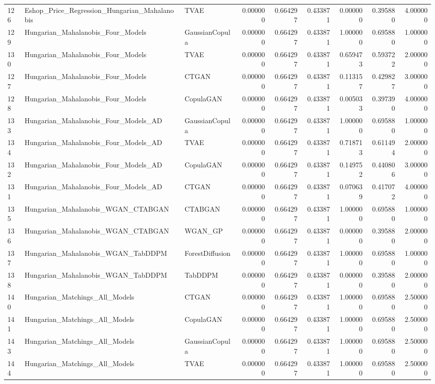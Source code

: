 \begin{tabular}{lllrrrrrr}
126 & Eshop_Price_Regression_Hungarian_Mahalanobis & TVAE & 0.000000 & 0.664297 & 0.433871 & 0.000000 & 0.395880 & 4.000000 \\
129 & Hungarian_Mahalanobis_Four_Models & GaussianCopula & 0.000000 & 0.664297 & 0.433871 & 1.000000 & 0.695880 & 1.000000 \\
130 & Hungarian_Mahalanobis_Four_Models & TVAE & 0.000000 & 0.664297 & 0.433871 & 0.659473 & 0.593722 & 2.000000 \\
127 & Hungarian_Mahalanobis_Four_Models & CTGAN & 0.000000 & 0.664297 & 0.433871 & 0.113157 & 0.429827 & 3.000000 \\
128 & Hungarian_Mahalanobis_Four_Models & CopulaGAN & 0.000000 & 0.664297 & 0.433871 & 0.005033 & 0.397390 & 4.000000 \\
133 & Hungarian_Mahalanobis_Four_Models_AD & GaussianCopula & 0.000000 & 0.664297 & 0.433871 & 1.000000 & 0.695880 & 1.000000 \\
134 & Hungarian_Mahalanobis_Four_Models_AD & TVAE & 0.000000 & 0.664297 & 0.433871 & 0.718713 & 0.611494 & 2.000000 \\
132 & Hungarian_Mahalanobis_Four_Models_AD & CopulaGAN & 0.000000 & 0.664297 & 0.433871 & 0.149752 & 0.440806 & 3.000000 \\
131 & Hungarian_Mahalanobis_Four_Models_AD & CTGAN & 0.000000 & 0.664297 & 0.433871 & 0.070639 & 0.417072 & 4.000000 \\
135 & Hungarian_Mahalanobis_WGAN_CTABGAN & CTABGAN & 0.000000 & 0.664297 & 0.433871 & 1.000000 & 0.695880 & 1.000000 \\
136 & Hungarian_Mahalanobis_WGAN_CTABGAN & WGAN_GP & 0.000000 & 0.664297 & 0.433871 & 0.000000 & 0.395880 & 2.000000 \\
137 & Hungarian_Mahalanobis_WGAN_TabDDPM & ForestDiffusion & 0.000000 & 0.664297 & 0.433871 & 1.000000 & 0.695880 & 1.000000 \\
138 & Hungarian_Mahalanobis_WGAN_TabDDPM & TabDDPM & 0.000000 & 0.664297 & 0.433871 & 0.000000 & 0.395880 & 2.000000 \\
140 & Hungarian_Matchings_All_Models & CTGAN & 0.000000 & 0.664297 & 0.433871 & 1.000000 & 0.695880 & 2.500000 \\
141 & Hungarian_Matchings_All_Models & CopulaGAN & 0.000000 & 0.664297 & 0.433871 & 1.000000 & 0.695880 & 2.500000 \\
143 & Hungarian_Matchings_All_Models & GaussianCopula & 0.000000 & 0.664297 & 0.433871 & 1.000000 & 0.695880 & 2.500000 \\
144 & Hungarian_Matchings_All_Models & TVAE & 0.000000 & 0.664297 & 0.433871 & 1.000000 & 0.695880 & 2.500000 \\

\end{tabular}
